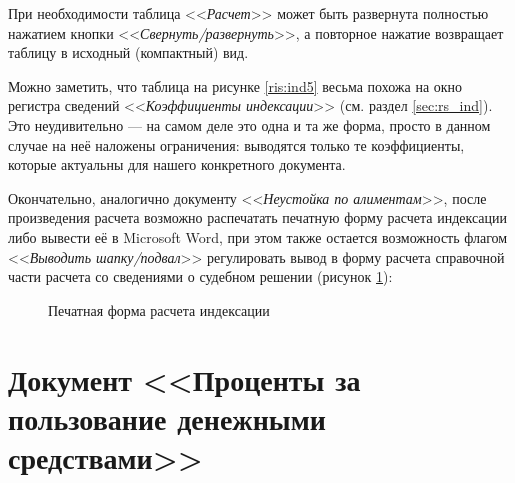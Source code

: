 \documentclass[a4paper,12pt,draft]{article}
\begin{document}
При необходимости таблица <<{\it Расчет}>> может быть развернута полностью нажатием кнопки <<{\it Свернуть/развернуть}>>, а повторное нажатие возвращает таблицу в исходный (компактный) вид.

Можно заметить, что таблица на рисунке \ref{ris:ind5} весьма похожа на окно регистра сведений <<{\it Коэффициенты индексации}>> (см. раздел \ref{sec:rs_ind}). Это неудивительно --- на самом деле это одна и та же форма, просто в данном случае на неё наложены ограничения: выводятся только те коэффициенты, которые актуальны для нашего конкретного документа.

Окончательно, аналогично документу <<{\it Неустойка по алиментам}>>, после произведения расчета возможно распечатать печатную форму расчета индексации либо вывести её в Microsoft Word, при этом также остается возможность флагом <<{\it Выводить шапку/подвал}>> регулировать вывод в форму расчета справочной части расчета со сведениями о судебном решении (рисунок \ref{ris:ind6}):
\begin{figure}[h]
\caption{Печатная форма расчета индексации}
\label{ris:ind6}
\end{figure}
\clearpage
\section{Документ <<Проценты за пользование денежными средствами>>}
\end{document}
